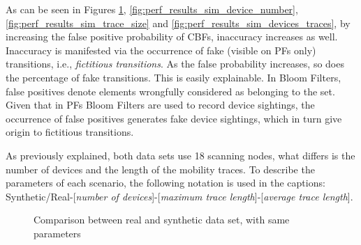 As can be seen in Figures \ref{fig:perf_results_real_sim},
\ref{fig:perf_results_sim_device_number},
\ref{fig:perf_results_sim_trace_size} and
\ref{fig:perf_results_sim_devices_traces}, by increasing the false
positive probability of CBFs, inaccuracy increases as well.
Inaccuracy is manifested via the occurrence of fake (visible on PFs
only) transitions, i.e., \emph{fictitious transitions}. As the false
probability increases, so does the percentage of fake transitions.
This is easily explainable. In Bloom Filters, false positives denote
elements wrongfully considered as belonging to the set.  Given that in
PFs Bloom Filters are used to record device sightings, the occurrence
of false positives generates fake device sightings, which in turn give
origin to fictitious transitions.

As previously explained, both data sets use 18 scanning nodes, what
differs is the number of devices and the length of the mobility
traces. To describe the parameters of each scenario, the following
notation is used in the captions: Synthetic/Real-[\emph{number of
  devices}]-[\emph{maximum trace length}]-[\emph{average trace
  length}].

\begin{figure}[htb]
\centering
{}\hspace*{-0.7em}
\caption{Comparison between real and synthetic data set, with same parameters}
\label{fig:perf_results_real_sim}
\end{figure}


